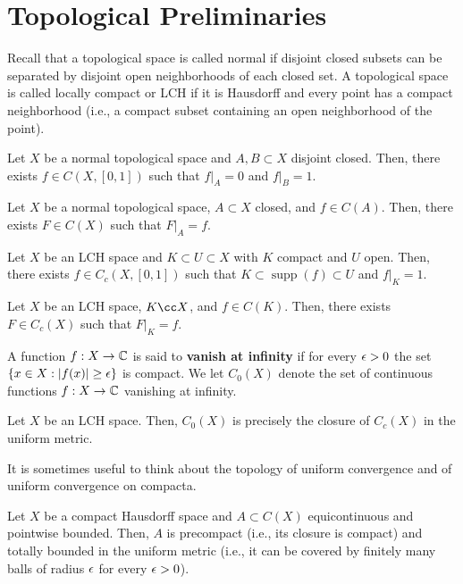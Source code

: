 \documentclass[11pt]{article}
\DeclareMathOperator{\supp}{supp} %
\begin{document}
\section{Topological Preliminaries}
Recall that a topological space is called normal if disjoint closed subsets can be separated by disjoint open neighborhoods of each closed set. A topological space is called locally compact or LCH if it is Hausdorff and every point has a compact neighborhood (i.e., a compact subset containing an open neighborhood of the point).

\begin{theorem}
Let $X$ be a normal topological space and $A,B\subset X$ disjoint closed. Then, there exists $f\in C(X,[0,1])$ such that $f|_A=0$ and $f|_B=1$.
\end{theorem}

\begin{theorem}
Let $X$ be a normal topological space, $A\subset X$ closed, and $f\in C(A)$. Then, there exists $F\in C(X)$ such that $F|_A=f$.
\end{theorem}

\begin{theorem}
Let $X$ be an LCH space and $K\subset U\subset X$ with $K$ compact and $U$ open. Then, there exists $f\in C_c(X,[0,1])$ such that $K\subset\supp(f)\subset U$ and $f|_K=1$.
\end{theorem}

\begin{theorem}
Let $X$ be an LCH space, $K\cc X$, and $f\in C(K)$. Then, there exists $F\in C_c(X)$ such that $F|_K=f$.
\end{theorem}

A function $f: X\to\mathbb{C}$ is said to \textbf{vanish at infinity} if for every $\epsilon>0$ the set $\{x\in X : |f(x)|\geq\epsilon\}$ is compact. We let $C_0(X)$ denote the set of continuous functions $f: X\to\mathbb{C}$ vanishing at infinity.

\begin{proposition}
Let $X$ be an LCH space. Then, $C_0(X)$ is precisely the closure of $C_c(X)$ in the uniform metric.
\end{proposition}

It is sometimes useful to think about the topology of uniform convergence and of uniform convergence on compacta.

\begin{theorem}
Let $X$ be a compact Hausdorff space and $A\subset C(X)$ equicontinuous and pointwise bounded. Then, $A$ is precompact (i.e., its closure is compact) and totally bounded in the uniform metric (i.e., it can be covered by finitely many balls of radius $\epsilon$ for every $\epsilon>0$).
\end{theorem}
\end{document}
